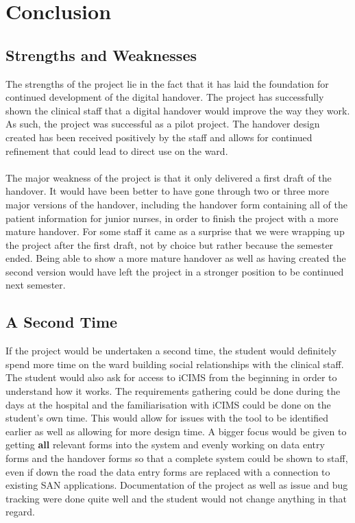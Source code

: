\section{Conclusion}
\subsection{Strengths and Weaknesses}
The strengths of the project lie in the fact that it has laid the foundation for continued development of the digital handover. The project has successfully shown the clinical staff that a digital handover would improve the way they work. As such, the project was successful as a pilot project. The handover design created has been received positively by the staff and allows for continued refinement that could lead to direct use on the ward. 
\\ \\ 
The major weakness of the project is that it only delivered a first draft of the handover. It would have been better to have gone through two or three more major versions of the handover, including the handover form containing all of the patient information for junior nurses, in order to finish the project with a more mature handover. For some staff it came as a surprise that we were wrapping up the project after the first draft, not by choice but rather because the semester ended. Being able to show a more mature handover as well as having created the second version would have left the project in a stronger position to be continued next semester.

\subsection{A Second Time}
If the project would be undertaken a second time, the student would definitely spend more time on the ward building social relationships with the clinical staff. The student would also ask for access to iCIMS from the beginning in order to understand how it works. The requirements gathering could be done during the days at the hospital and the familiarisation with iCIMS could be done on the student's own time. This would allow for issues with the tool to be identified earlier as well as allowing for more design time. A bigger focus would be given to getting \textbf{all} relevant forms into the system and evenly working on data entry forms and the handover forms so that a complete system could be shown to staff, even if down the road the data entry forms are replaced with a connection to existing SAN applications. Documentation of the project as well as issue and bug tracking were done quite well and the student would not change anything in that regard.

